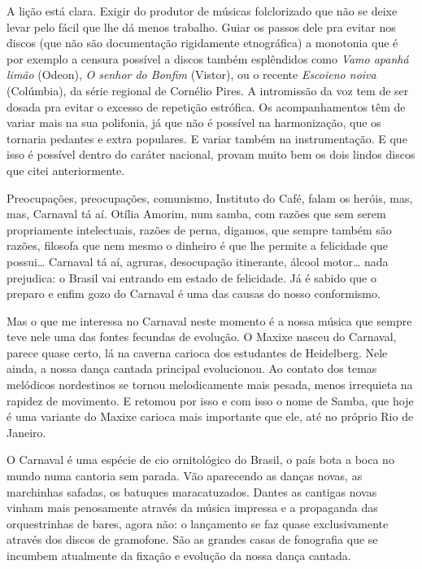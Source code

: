 A lição está clara. Exigir do produtor de músicas folclorizado que não
se deixe levar pelo fácil que lhe dá menos trabalho. Guiar os passos
dele pra evitar nos discos (que não são documentação rigidamente
etnográfica) a monotonia que é por exemplo a censura possível a discos
também esplêndidos como \emph{Vamo apanhá limão} (Odeon), \emph{O senhor
do Bonfim} (Vistor), ou o recente \emph{Escoieno noiva} (Colúmbia), da
série regional de Cornélio Pires. A intromissão da voz tem de ser dosada
pra evitar o excesso de repetição estrófica. Os acompanhamentos têm de
variar mais na sua polifonia, já que não é possível na harmonização, que
os tornaria pedantes e extra populares. E variar também na
instrumentação. E que isso é possível dentro do caráter nacional, provam
muito bem os dois lindos discos que citei anteriormente.




Preocupações, preocupações, comunismo, Instituto do Café, falam os
heróis, mas, mas, Carnaval tá aí. Otília Amorim, num samba, com razões
que sem serem propriamente intelectuais, razões de perna, digamos, que
sempre também são razões, filosofa que nem mesmo o dinheiro é que lhe
permite a felicidade que possui\ldots{} Carnaval tá aí, agruras, desocupação
itinerante, álcool motor\ldots{} nada prejudica: o Brasil vai entrando em
estado de felicidade. Já é sabido que o preparo e enfim gozo do Carnaval
é uma das causas do nosso conformismo.

Mas o que me interessa no Carnaval neste momento é a nossa música que
sempre teve nele uma das fontes fecundas de evolução. O Maxixe nasceu do
Carnaval, parece quase certo, lá na caverna carioca dos estudantes de
Heidelberg. Nele ainda, a nossa dança cantada principal evolucionou. Ao
contato dos temas melódicos nordestinos se tornou melodicamente mais
pesada, menos irrequieta na rapidez de movimento. E retomou por isso e
com isso o nome de Samba, que hoje é uma variante do Maxixe carioca mais
importante que ele, até no próprio Rio de Janeiro.

O Carnaval é uma espécie de cio ornitológico do Brasil, o país bota a
boca no mundo numa cantoria sem parada. Vão aparecendo as danças novas,
as marchinhas safadas, os batuques maracatuzados. Dantes as cantigas
novas vinham mais penosamente através da música impressa e a propaganda
das orquestrinhas de bares, agora não: o lançamento se faz quase
exclusivamente através dos discos de gramofone. São as grandes casas de
fonografia que se incumbem atualmente da fixação e evolução da nossa
dança cantada.

